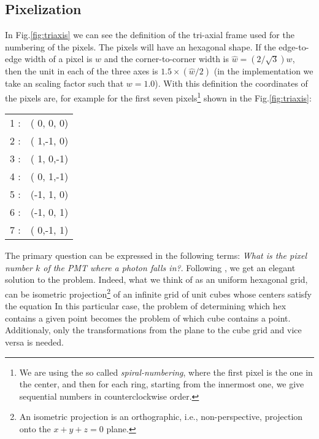 \zonesfig

\zonesfocalsfig

\subsection{Pixelization}

In Fig.\ref{fig:triaxis} we can see the definition of the tri-axial
frame used for the numbering of the pixels. The pixels will have an
hexagonal shape. If the edge-to-edge width of a pixel is $w$ and the
corner-to-corner width is $\hat{w}=(2/\sqrt{3}) w$, then the unit in
each of the three axes is $1.5\times (\hat{w}/2)$ (in the
implementation we take an scaling factor such that $w=1.0$).  With
this definition the coordinates of the pixels are, for example for the
first seven pixels\footnote{We are using the so called
  \emph{spiral-numbering}, where the first pixel is the one in the
  center, and then for each ring, starting from the innermost one, we
  give sequential numbers in counterclockwise order.} shown in the
Fig.\ref{fig:triaxis}:
%
\begin{center}
  \begin{tabular}{rc}
    1 :& ( 0, 0, 0) \\
    2 :& ( 1,-1, 0) \\
    3 :& ( 1, 0,-1) \\
    4 :& ( 0, 1,-1) \\
    5 :& (-1, 1, 0) \\
    6 :& (-1, 0, 1) \\
    7 :& ( 0,-1, 1) \\
  \end{tabular}
\end{center}

The primary question can be expressed in the following terms:
\emph{What is the pixel number $k$ of the PMT where a photon falls
  in?}.  Following \cite{Fu:hexgrid}, we get an elegant solution to
the problem. Indeed, what we think of as an uniform hexagonal grid,
can be isometric projection\footnote{An isometric projection is an
  orthographic, i.e., non-perspective, projection onto the $x+y+z=0$
  plane.} of an infinite grid of unit cubes whose centers satisfy the
equation
%
\planeeq
%
In this particular case, the problem of determining which hex contains
a given point becomes the problem of which cube contains a point.
Additionaly, only the transformations from the plane to the cube grid
and vice versa is needed.

